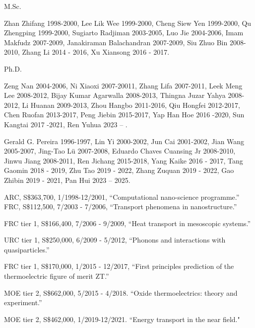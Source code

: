 
\bul M.Sc.

Zhan Zhifang 1998-2000,
Lee Lik Wee 1999-2000,
Cheng Siew Yen 1999-2000,
Qu Zhengping  1999-2000,
Sugiarto Radjiman 2003-2005,
Luo Jie 2004-2006,
Imam Makfudz 2007-2009,
Janakiraman Balachandran 2007-2009,
Siu Zhuo Bin 2008-2010,
Zhang Li 2014 - 2016,
Xu Xiansong 2016 - 2017.

\bul Ph.D.                                                             
           
Zeng Nan 2004-2006,                                       
Ni Xiaoxi 2007-20011,                                    
Zhang Lifa 2007-2011,                                     
Leek Meng Lee 2008-2012,                             
Bijay Kumar Agarwalla 2008-2013,                         
Thingna Juzar Yahya 2008-2012,                           
Li Huanan 2009-2013,                                             
Zhou Hangbo 2011-2016,                                         
Qiu Hongfei 2012-2017,
Chen Ruofan 2013-2017,
Peng Jiebin 2015-2017, 
Yap Han Hoe 2016 -2020,
Sun Kangtai 2017 -2021,
Ren Yuhua 2023 -- .
                                       

Gerald G. Pereira 1996-1997,
Lin Yi 2000-2002,
Jun Cai 2001-2002, 
Jian Wang 2005-2007,
Jing-Tao L\"u 2007-2008,
Eduardo Chaves Cuansing Jr 2008-2010,
Jinwu Jiang 2008-2011,
Ren Jichang 2015-2018,
Yang Kaike 2016 - 2017,
Tang Gaomin 2018 - 2019,
Zhu Tao 2019 - 2022,
Zhang Zuquan 2019 - 2022,
Gao Zhibin 2019 - 2021,
Pan Hui 2023 -- 2025. 




\bul ARC, S\$363,700, 1/1998-12/2001, ``Computational nano-science programme.''
\bul FRC, S\$112,500, 7/2003 - 7/2006, ``Transport phenomena in 
nanostructure.''

\bul FRC tier 1, S\$166,400, 7/2006 - 9/2009, 
``Heat transport in mesoscopic systems.''

\bul URC tier 1, S\$250,000, 6/2009 - 5/2012, 
``Phonons and interactions with quasiparticles.''

\bul FRC tier 1, S\$170,000, 1/2015 - 12/2017,
``First principles prediction of the thermoelectric figure of merit ZT.''

\bul MOE tier 2, S\$662,000, 5/2015 - 4/2018.
``Oxide thermoelectrics: theory and experiment.''

\bul MOE tier 2, S\$462,000, 1/2019-12/2021.  
``Energy transport in the near field."

